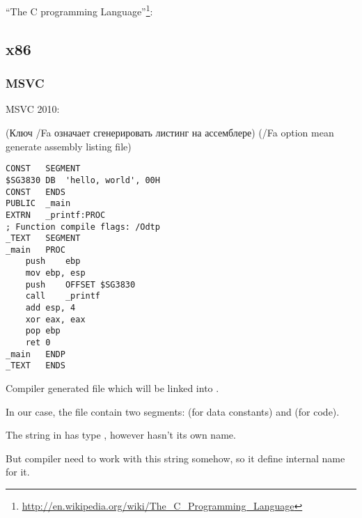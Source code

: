 ﻿\section{\HelloWorldSectionName}
\label{sec:helloworld}

 ``The C programming Language''\footnote{\url{http://en.wikipedia.org/wiki/The_C_Programming_Language}}:



\subsection{x86}

\subsubsection{MSVC}

 MSVC 2010: 

\IFRU
{(Ключ /Fa означает сгенерировать листинг на ассемблере)}
{(/Fa option mean generate assembly listing file)}

\begin{lstlisting}
CONST	SEGMENT
$SG3830	DB	'hello, world', 00H
CONST	ENDS
PUBLIC	_main
EXTRN	_printf:PROC
; Function compile flags: /Odtp
_TEXT	SEGMENT
_main	PROC
	push	ebp
	mov	ebp, esp
	push	OFFSET $SG3830
	call	_printf
	add	esp, 4
	xor	eax, eax
	pop	ebp
	ret	0
_main	ENDP
_TEXT	ENDS
\end{lstlisting}

{Compiler generated  file which will be linked into .}

{In our case, the file contain two segments:  (for data constants) and  (for code).} 

{The string  in \CCpp has type , however hasn't its own name.}

{But compiler need to work with this string somehow, so it define internal name  for it.}

